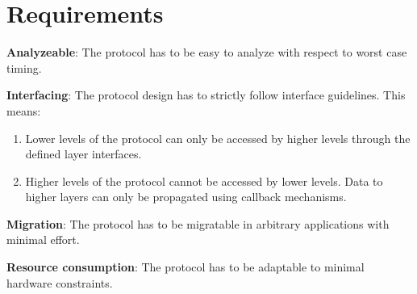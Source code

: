 \section{Requirements}
\label{sec:bus:requirements}

\begin{req}
\label{req:ulftrtp:analyzeable}
\textbf{Analyzeable}: The protocol has to be easy to analyze with respect to worst case timing.
\end{req}

\begin{req}
\label{req:ulftrtp:interfacing}
\textbf{Interfacing}: The protocol design has to strictly follow interface guidelines. This means:
\begin{enumerate}
 \item Lower levels of the protocol can only be accessed by higher levels through the defined layer interfaces.
 \item Higher levels of the protocol cannot be accessed by lower levels. Data to higher layers can only be propagated 
using callback mechanisms. 
\end{enumerate}
\end{req}

\begin{req}
\label{req:ulftrtp:easy migration}
\textbf{Migration}: The protocol has to be migratable in arbitrary applications with minimal effort.
\end{req}

\begin{req}
\label{req:ulftrtp:resource consumption}
\textbf{Resource consumption}: The protocol has to be adaptable to minimal hardware constraints.
\end{req}
